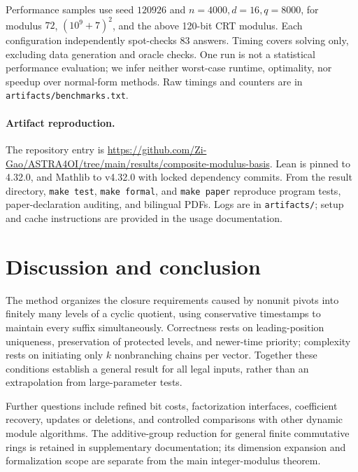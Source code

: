 \documentclass[11pt,a4paper]{article}
\theoremstyle{definition}
\theoremstyle{plain}
\begin{document}
Performance samples use seed $120926$ and $n=4000,d=16,q=8000$, for modulus $72$, $(10^9+7)^2$,
and the above 120-bit CRT modulus. Each configuration independently spot-checks 83 answers.
Timing covers solving only, excluding data generation and oracle checks. One run is not a
statistical performance evaluation; we infer neither worst-case runtime, optimality, nor speedup
over normal-form methods. Raw timings and counters are in \texttt{artifacts/benchmarks.txt}.

\paragraph{Artifact reproduction.}
The repository entry is \url{https://github.com/Zi-Gao/ASTRA4OI/tree/main/results/composite-modulus-basis}.
Lean is pinned to 4.32.0, and Mathlib to v4.32.0 with locked dependency commits. From the result
directory, \texttt{make test}, \texttt{make formal}, and \texttt{make paper} reproduce program tests,
paper-declaration auditing, and bilingual PDFs. Logs are in \texttt{artifacts/}; setup and cache
instructions are provided in the usage documentation.

\section{Discussion and conclusion}
The method organizes the closure requirements caused by nonunit pivots into finitely many levels
of a cyclic quotient, using conservative timestamps to maintain every suffix simultaneously.
Correctness rests on leading-position uniqueness, preservation of protected levels, and newer-time
priority; complexity rests on initiating only $k$ nonbranching chains per vector. Together these
conditions establish a general result for all legal inputs, rather than an extrapolation from
large-parameter tests.

Further questions include refined bit costs, factorization interfaces, coefficient recovery,
updates or deletions, and controlled comparisons with other dynamic module algorithms. The
additive-group reduction for general finite commutative rings is retained in supplementary
documentation; its dimension expansion and formalization scope are separate from the main
integer-modulus theorem.
{\small


}
\end{document}
